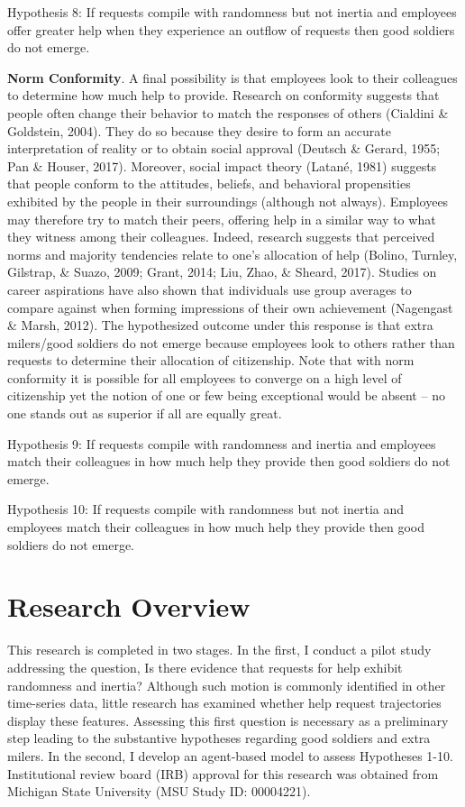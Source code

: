 \documentclass[english,,man]{apa6}
\begin{document}
Hypothesis 8: If requests compile with randomness but not inertia and employees offer greater help when they experience an outflow of requests then good soldiers do not emerge.

\textbf{Norm Conformity}. A final possibility is that employees look to their colleagues to determine how much help to provide. Research on conformity suggests that people often change their behavior to match the responses of others (Cialdini \& Goldstein, 2004). They do so because they desire to form an accurate interpretation of reality or to obtain social approval (Deutsch \& Gerard, 1955; Pan \& Houser, 2017). Moreover, social impact theory (Latané, 1981) suggests that people conform to the attitudes, beliefs, and behavioral propensities exhibited by the people in their surroundings (although not always). Employees may therefore try to match their peers, offering help in a similar way to what they witness among their colleagues. Indeed, research suggests that perceived norms and majority tendencies relate to one's allocation of help (Bolino, Turnley, Gilstrap, \& Suazo, 2009; Grant, 2014; Liu, Zhao, \& Sheard, 2017). Studies on career aspirations have also shown that individuals use group averages to compare against when forming impressions of their own achievement (Nagengast \& Marsh, 2012). The hypothesized outcome under this response is that extra milers/good soldiers do not emerge because employees look to others rather than requests to determine their allocation of citizenship. Note that with norm conformity it is possible for all employees to converge on a high level of citizenship yet the notion of one or few being exceptional would be absent -- no one stands out as superior if all are equally great.

Hypothesis 9: If requests compile with randomness and inertia and employees match their colleagues in how much help they provide then good soldiers do not emerge.

Hypothesis 10: If requests compile with randomness but not inertia and employees match their colleagues in how much help they provide then good soldiers do not emerge.

\hypertarget{research-overview}{%
\section{Research Overview}\label{research-overview}}

This research is completed in two stages. In the first, I conduct a pilot study addressing the question, Is there evidence that requests for help exhibit randomness and inertia? Although such motion is commonly identified in other time-series data, little research has examined whether help request trajectories display these features. Assessing this first question is necessary as a preliminary step leading to the substantive hypotheses regarding good soldiers and extra milers. In the second, I develop an agent-based model to assess Hypotheses 1-10. Institutional review board (IRB) approval for this research was obtained from Michigan State University (MSU Study ID: 00004221).
\end{document}
